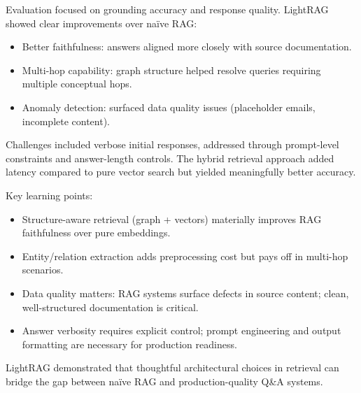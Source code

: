 Evaluation focused on grounding accuracy and response quality. LightRAG showed
clear improvements over naïve RAG:

\begin{itemize}
    \item Better faithfulness: answers aligned more closely with source
          documentation.
    \item Multi-hop capability: graph structure helped resolve queries
          requiring multiple conceptual hops.
    \item Anomaly detection: surfaced data quality issues (placeholder emails,
          incomplete content).
\end{itemize}

Challenges included verbose initial responses, addressed through prompt-level
constraints and answer-length controls. The hybrid retrieval approach added
latency compared to pure vector search but yielded meaningfully better
accuracy.

Key learning points:

\begin{itemize}
    \item Structure-aware retrieval (graph + vectors) materially improves RAG
          faithfulness over pure embeddings.
    \item Entity/relation extraction adds preprocessing cost but pays off in
          multi-hop scenarios.
    \item Data quality matters: RAG systems surface defects in source content;
          clean, well-structured documentation is critical.
    \item Answer verbosity requires explicit control; prompt engineering and
          output formatting are necessary for production readiness.
\end{itemize}

LightRAG demonstrated that thoughtful architectural choices in retrieval can
bridge the gap between naïve RAG and production-quality Q\&A systems.
